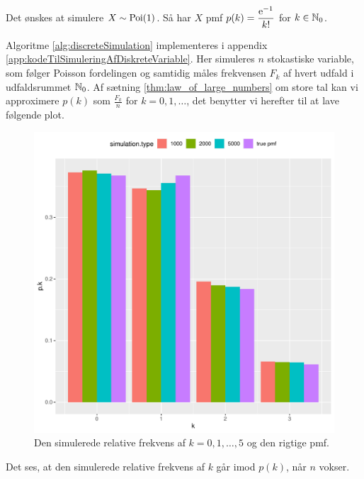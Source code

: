 \begin{exmp} \label{exmp:simuleringAfDiskreteVariable}
    Det ønskes at simulere $X \sim \textnormal{Poi}(1)$. Så har $X$ pmf $p(k) = \dfrac{\mathrm{e}^{-1}}{k!}$ for $k \in \mathbb{N}_0$.
    
    Algoritme \ref{alg:discreteSimulation} implementeres i appendix \ref{app:kodeTilSimuleringAfDiskreteVariable}. Her simuleres $n$ stokastiske variable, som følger Poisson fordelingen og samtidig måles frekvensen $F_k$ af hvert udfald i udfaldsrummet $\mathbb{N}_0$.
    Af sætning \ref{thm:law_of_large_numbers} om store tal kan vi approximere $p(k)$ som $\frac{F_k}{n}$ for $k = 0, 1, \ldots$, det benytter vi herefter til at lave følgende plot. 
    \begin{figure}[H]
        \centering
        \includegraphics[scale=0.5]{code/barplot.png}
        \caption{Den simulerede relative frekvens af $k = 0, 1, \ldots, 5$ og den rigtige pmf.}
        \label{fig:simuleringAfPoisson}
    \end{figure}
    Det ses, at den simulerede relative frekvens af $k$ går imod $p(k)$, når $n$ vokser.
\end{exmp}

